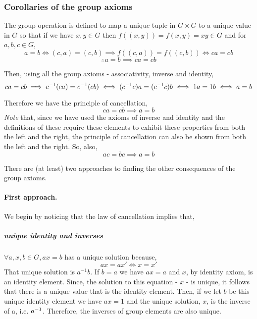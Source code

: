 \documentclass[MathsNotesBase.tex]{subfiles}
\begin{document}
{		\bigskip\bigskip
		\subsubsection{Corollaries of the group axioms}
		The group operation is defined to map a unique tuple in $G \times G$ to a unique value in $G$ so that if we have $x,y \in G$ then $f((x, y)) = f(x,y) = xy \in G$ and for $a,b,c \in G$,
		\[ a = b \iff (c, a) = (c, b) \implies f((c, a)) = f((c, b)) \iff ca = cb \]
		\[ \therefore a = b \implies ca = cb \]
		
		Then, using all the group axioms - associativity, inverse and identity,
		\[ ca = cb \implies {c}^{-1}(ca) = {c}^{-1}(cb) \iff ({c}^{-1}c)a = ({c}^{-1}c)b \iff 1a = 1b \iff a = b \]
		
		Therefore we have the principle of cancellation,
		\[ ca = cb \implies a = b \]
		\textit{Note} that, since we have used the axioms of inverse and identity and the definitions of these require these elements to exhibit these properties from both the left and the right, the principle of cancellation can also be shown from both the left and the right. So, also,
		\[ ac = bc \implies a = b \]
		
		\bigskip\bigskip
		There are (at least) two approaches to finding the other consequences of the group axioms.
		\paragraph*{First approach.} We begin by noticing that the law of cancellation implies that,
		\subparagraph*{unique identity and inverses}$\forall a,x,b \in G, ax = b$ has a unique solution because,
		\[ ax = ax' \iff x = x' \]
		That unique solution is $a^{-1}b$. If $b=a$ we have $ax=a$ and $x$, by identity axiom, is an identity element. Since, the solution to this equation - $x$ - is unique, it follows that there is a unique value that is the identity element. Then, if we let $b$ be this unique identity element we have $ax=1$ and the unique solution, $x$, is the inverse of a, i.e. ${a}^{-1}$. Therefore, the inverses of group elements are also unique.
		
}
\end{document}

